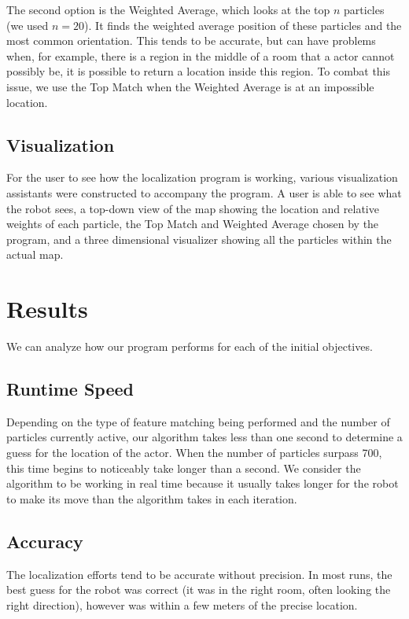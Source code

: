 \documentclass[a4paper,11pt]{article}
\begin{document}
The second option is the Weighted Average, which looks at the top $n$ particles (we used $n=20$). It finds the weighted average position of these particles and the most common orientation. This tends to be accurate, but can have problems when, for example, there is a region in the middle of a room that a actor cannot possibly be, it is possible to return a location inside this region. To combat this issue, we use the Top Match when the Weighted Average is at an impossible location.

\subsection{Visualization}
For the user to see how the localization program is working, various visualization assistants were constructed to accompany the program. A user is able to see what the robot sees, a top-down view of the map showing the location and relative weights of each particle, the Top Match and Weighted Average chosen by the program, and a three dimensional visualizer showing all the particles within the actual map.












\section{Results}
We can analyze how our program performs for each of the initial objectives.

\subsection{Runtime Speed}
Depending on the type of feature matching being performed and the number of particles currently active, our algorithm takes less than one second to determine a guess for the location of the actor. When the number of particles surpass 700, this time begins to noticeably take longer than a second. We consider the algorithm to be working in real time because it usually takes longer for the robot to make its move than the algorithm takes in each iteration.

\subsection{Accuracy}
The localization efforts tend to be accurate without precision. In most runs, the best guess for the robot was correct (it was in the right room, often looking the right direction), however was within a few meters of the precise location. 
\end{document}

